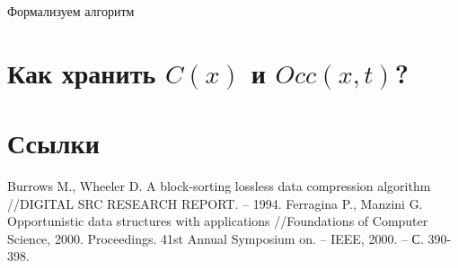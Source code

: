 \documentclass[letterpaper, 11pt]{article}
\begin{document}
Формализуем алгоритм
\begin{algorithmic}[1]


\EndProcedure
\end{algorithmic}

\section{Как хранить $C(x)$ и $Occ(x, t)$?}
\section{Ссылки}

\begingroup
\renewcommand{\section}[2]{}%
\begin{thebibliography}{7}
Burrows M., Wheeler D. A block-sorting lossless data compression algorithm //DIGITAL SRC RESEARCH REPORT. – 1994.
Ferragina P., Manzini G. Opportunistic data structures with applications //Foundations of Computer Science, 2000. Proceedings. 41st Annual Symposium on. – IEEE, 2000. – С. 390-398.

\end{thebibliography}
\endgroup
\end{document}
